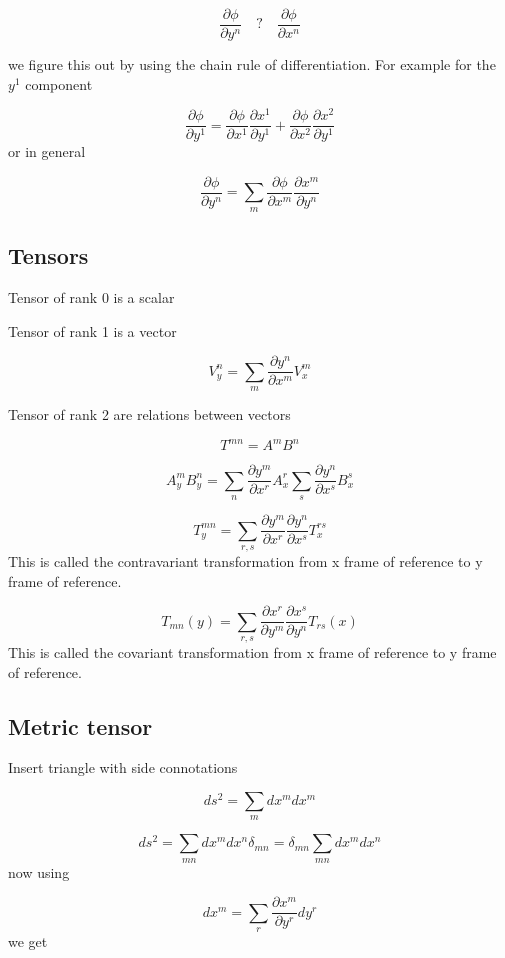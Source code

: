 \documentclass[empty]{article}
\newcommand{\dd}[2]{\frac{\partial #1}{\partial #2}}
\begin{document}
$$
   \dd{\phi}{y^n} \quad ? \quad  \dd{\phi}{x^n}  
$$

we figure this out by using the chain rule of differentiation. For example for the $y^1$ component

$$
   \dd{\phi}{y^1}  = \dd{\phi}{x^1}\dd{x^1}{y^1} + \dd{\phi}{x^2}\dd{x^2}{y^1}  
$$
or in general

\begin{equation}
   \dd{\phi}{y^n} = \sum_m \dd{\phi}{x^m}\dd{x^m}{y^n}
\end{equation}

\subsection{Tensors}

Tensor of rank 0 is a scalar

Tensor of rank 1 is a vector

\begin{equation}
    V_y^n = \sum_m \dd{y^n}{x^m} V_x^m
\end{equation}

Tensor of rank 2 are relations between vectors

$$
   T^{mn} = A^m B^n
$$

$$
    A_y^m B_y^n = \sum_n \dd{y^m}{x^r} A_x^r  \sum_s \dd{y^n}{x^s} B_x^s 
$$

\begin{equation}
   T_y^{mn} = \sum_{r,s} \dd{y^m}{x^r} \dd{y^n}{x^s} T_x^{rs}
\end{equation}
This is called the contravariant transformation from x frame of reference to y frame of reference.

\begin{equation}
   T_{mn}(y) = \sum_{r,s} \dd{x^r}{y^m} \dd{x^s}{y^n} T_{rs}(x)
\end{equation}
This is called the covariant transformation from x frame of reference to y frame of reference.

\subsection{Metric tensor}

Insert triangle with side connotations

$$
   ds^2 = \sum_m dx^m dx^m
$$

$$
   ds^2 = \sum_{mn} dx^m dx^n \delta_{mn} =  \delta_{mn}\sum_{mn} dx^m dx^n
$$
now using 

$$
   dx^m = \sum_{r} \dd{x^m}{y^r} dy^r
$$
we get
\end{document}
